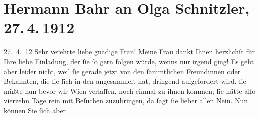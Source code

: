 

         
         \renewcommand{\erwaehntePersonen}{Personen: Anna Bahr-Mildenburg, Olga Schnitzler}
         \renewcommand{\erwaehnteInstitutionen}{Institutionen: Staatsoper}
         \renewcommand{\erwaehnteOrte}{Orte: Wien}
         \renewcommand{\erwaehnteWerke}{}
               \section[Hermann Bahr an Olga Schnitzler, 27. 4. 1912]{ Hermann Bahr an Olga Schnitzler, 27. 4. 1912}\nopagebreak{}\rehead{ }\begin{ledgroupsized}[t]{13cm}\normalsize\beginnumbering \toendnotes[C]{\smallbreak\pagebreak[2]} 
\toendnotes[C]{\smallbreak}\pstart
           \raggedleft{}{\pb}27. 4. 12\pend
           \pstart\center{}Sehr verehrte liebe gnädige Frau!\pend\pstart
           Meine Frau dankt Ihnen
               herzlichſt für Ihre liebe Einladung, der ſie ſo gern folgen würde, wenns nur irgend
               ging! Es geht aber leider nicht, weil ſie gerade jetzt von den ſämmtlichen
               Freundinnen oder Bekannten, die ſie ſich in den \label{K_L02060_1v}\label{K_L02060_1h} angesammelt hat, dringend
               aufgefordert wird, ſie müßte nun bevor wir Wien
               verlaſſen, noch einmal zu ihnen kommen; ſie hätte alſo vierzehn Tage rein mit
               Beſuchen zuzubringen, da ſagt ſie lieber allen Nein. Nun können Sie ſich aber

\end{ledgroupsized}

